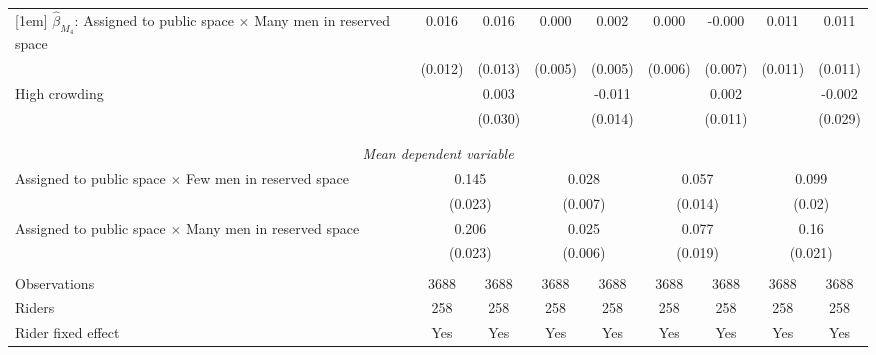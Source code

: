 \begin{tabular}{l*{8}{c}}
[1em]
$\hat\beta_{M_4}$: Assigned to public space $\times$ Many men in reserved space&       0.016         &       0.016         &       0.000         &       0.002         &       0.000         &      -0.000         &       0.011         &       0.011         \\
                    &     (0.012)         &     (0.013)         &     (0.005)         &     (0.005)         &     (0.006)         &     (0.007)         &     (0.011)         &     (0.011)         \\
[1em]
High crowding       &                     &       0.003         &                     &      -0.011         &                     &       0.002         &                     &      -0.002         \\
                    &                     &     (0.030)         &                     &     (0.014)         &                     &     (0.011)         &                     &     (0.029)         \\
\\[-1.8ex] \hline \\[-1.8ex] \multicolumn{9}{c}{\textit{Mean dependent variable}} \\ Assigned to public space $\times$ Few men in reserved space& \multicolumn{2}{c}{0.145} & \multicolumn{2}{c}{0.028} & \multicolumn{2}{c}{0.057} & \multicolumn{2}{c}{0.099} \\  & \multicolumn{2}{c}{(0.023)} & \multicolumn{2}{c}{(0.007)} & \multicolumn{2}{c}{(0.014)} & \multicolumn{2}{c}{(0.02)} \\ Assigned to public space $\times$ Many men in reserved space & \multicolumn{2}{c}{0.206} & \multicolumn{2}{c}{0.025} & \multicolumn{2}{c}{0.077} & \multicolumn{2}{c}{0.16} \\  & \multicolumn{2}{c}{(0.023)} & \multicolumn{2}{c}{(0.006)} & \multicolumn{2}{c}{(0.019)} & \multicolumn{2}{c}{(0.021)} \\\\[-1ex] 
Observations        &        3688         &        3688         &        3688         &        3688         &        3688         &        3688         &        3688         &        3688         \\
Riders              &         258         &         258         &         258         &         258         &         258         &         258         &         258         &         258         \\
Rider fixed effect  &         Yes         &         Yes         &         Yes         &         Yes         &         Yes         &         Yes         &         Yes         &         Yes         \\

\end{tabular}
